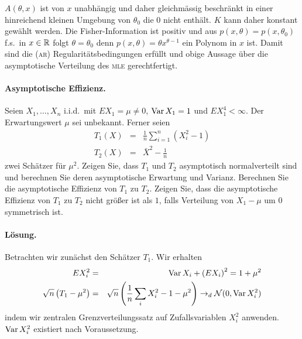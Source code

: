 $A(\theta,x)$ ist von $x$ unabhängig und daher gleichmässig beschränkt in einer
hinreichend kleinen Umgebung von $\theta_0$ die $0$ nicht enthält. $K$ kann daher konstant 
gewählt werden. Die Fisher-Information ist positiv und aus $p(x,\theta)=p(x,\theta_0)$ f.s.\ in
$x\in\mathbb R$ folgt $\theta=\theta_0$ denn $p(x,\theta)= \theta x^{\theta-1}$ ein Polynom in $x$ ist. 
Damit sind die \textsc{(ar)} Regularitätsbedingungen erfüllt und obige Aussage über die
asymptotische Verteilung des \textsc{mle} gerechtfertigt.








\paragraph{Asymptotische Effizienz. } Seien $X_1,\ldots,X_n$ i.i.d.\ mit $E X_1=\mu\neq 0$,
$\operatorname{Var} X_1 = 1$ und $E X_1^4 < \infty$. Der Erwartungswert $\mu$ sei unbekannt. 
Ferner seien 
\begin{eqnarray}
    T_1(X) &=& \frac{1}{n} \sum_{i=1}^{n} \left( X_i^2 -1 \right) \\
    T_2(X) &=& {\bar X}^2 - \frac{1}{n}
\end{eqnarray}
zwei Schätzer für $\mu^2$. Zeigen Sie, dass $T_1$ und $T_2$ asymptotisch normalverteilt sind
und berechnen Sie deren asymptotische Erwartung und Varianz. Berechnen Sie 
die asymptotische Effizienz von $T_1$ zu $T_2$. Zeigen Sie, dass die asymptotische
Effizienz von $T_1$ zu $T_2$ nicht größer ist als $1$, falls Verteilung von $X_1 -\mu$
um $0$ symmetrisch ist.

\paragraph*{Lösung. } Betrachten wir zunächst den Schätzer $T_1$. Wir erhalten
\begin{eqnarray}
    E X_i^2 &=&  \operatorname{Var} X_i + \left( E X_i \right)^2 = 1 + \mu^2  \\
    \sqrt{n} \left( T_1 - \mu^2 \right) &=& 
    \sqrt{n}\left( \frac{1}{n} \sum_{i}^{} X_i^2 -1 -\mu^2 \right) \to_d \mathcal N(0, \operatorname{Var} X_i^2)
\end{eqnarray}
indem wir zentralen Grenzverteilungssatz auf Zufallsvariablen $X_i^2$ anwenden. $\operatorname{Var} X_i^2$ existiert
nach Voraussetzung.

